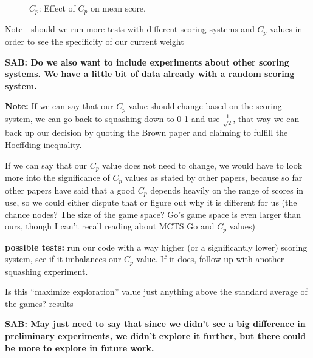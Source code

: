 \documentclass[letterpaper]{article}
\begin{document}
\begin{figure}
\begin{center}
\end{center}
\caption{$C_p$: Effect of $C_p$ on mean score.}
\label{fig:CPEXP}
\end{figure}

Note - should we run more tests with different scoring systems and $C_p$ values in order to see the specificity of our current weight

{\bf SAB: Do we also want to include experiments about other scoring systems. We have a little bit of data already with a random scoring system.}

{\bf Note:} If we can say that our $C_p$ value should change based on the scoring system, we can go back to squashing down to 0-1 and use $\frac{1}{\sqrt{2}}$, that way we can back up our decision by quoting the Brown paper and claiming to fulfill the Hoeffding inequality.

If we can say that our $C_p$ value does not need to change, we would have to look more into the significance of $C_p$ values as stated by other papers, because so far other papers have said that a good $C_p$ depends heavily on the range of scores in use, so we could either dispute that or figure out why it is different for us (the chance nodes? The size of the game space? Go’s game space is even larger than ours, though I can’t recall reading about MCTS Go and $C_p$ values)

{\bf possible tests:} run our code with a way higher (or a significantly lower) scoring system, see if it imbalances our $C_p$ value. If it does, follow up with another squashing experiment.

Is this “maximize exploration” value just anything above the standard average of the games? 
results

{\bf SAB: May just need to say that since we didn't see a big difference in preliminary experiments, we didn't explore it further, but there could be more to explore in future work.}
\end{document}

